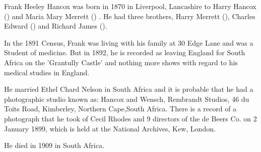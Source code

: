 
Frank Heeley Hancox was born in 1870 in Liverpool, Lancashire to Harry Hancox () and Maria Mary Merrett () \cite{FHHancoxBirth}. He had three brothers, Harry Merrett (), Charles Edward () and Richard James ().

In the 1891 Census, Frank was living with his family at 30 Edge Lane and was a Student of medicine.\cite{FrankHeeleyHancoxResidenceUK}  But in 1892, he is recorded as leaving England for South Africa on the 'Grantully Castle' \cite{FHHancoxTravel} and nothing more shows with regard to his medical studies in England. 

He married Ethel Chard Nelson in South Africa and it is probable that he had a photographic studio known as: Hancox and Wensch, Rembrandt Studios, 46 du Toits Road, Kimberley, Northern Cape,South Africa. There is a record of a photograph that he took of Cecil Rhodes and 9 directors of the de Beers Co. on 2 January 1899, which is held at the National Archives, Kew, London.  \cite{FHHancoxPhotos}

He died in 1909 in South Africa. \cite{FHHancoxDeath}
